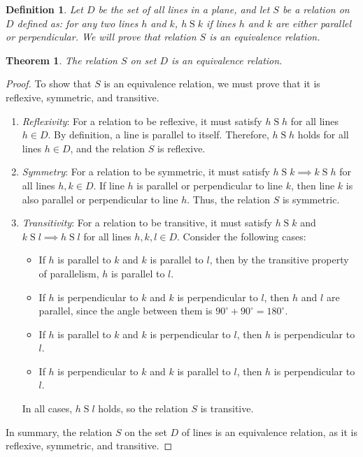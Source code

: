 \documentclass{article}
\newtheorem{theorem}{Theorem}
\newtheorem{definition}{Definition}
\begin{document}
\newpage

\begin{definition}
    Let $D$ be the set of all lines in a plane, and let $S$ be a relation on $D$ defined as: for any two lines $h$ and $k$, $h \mathrel{S} k$ if lines $h$ and $k$ are either parallel or perpendicular. We will prove that relation $S$ is an equivalence relation.
    \end{definition}
    
    \begin{theorem}
    The relation $S$ on set $D$ is an equivalence relation.
    \end{theorem}
    
    \begin{proof}
    To show that $S$ is an equivalence relation, we must prove that it is reflexive, symmetric, and transitive.
    
    \begin{enumerate}
    \item \textit{Reflexivity}: For a relation to be reflexive, it must satisfy $h \mathrel{S} h$ for all lines $h \in D$. By definition, a line is parallel to itself. Therefore, $h \mathrel{S} h$ holds for all lines $h \in D$, and the relation $S$ is reflexive.
    
    \item \textit{Symmetry}: For a relation to be symmetric, it must satisfy $h \mathrel{S} k \implies k \mathrel{S} h$ for all lines $h, k \in D$. If line $h$ is parallel or perpendicular to line $k$, then line $k$ is also parallel or perpendicular to line $h$. Thus, the relation $S$ is symmetric.
    
    \item \textit{Transitivity}: For a relation to be transitive, it must satisfy $h \mathrel{S} k$ and $k \mathrel{S} l \implies h \mathrel{S} l$ for all lines $h, k, l \in D$. Consider the following cases:
    
        \begin{itemize}
        \item If $h$ is parallel to $k$ and $k$ is parallel to $l$, then by the transitive property of parallelism, $h$ is parallel to $l$.
        \item If $h$ is perpendicular to $k$ and $k$ is perpendicular to $l$, then $h$ and $l$ are parallel, since the angle between them is $90^\circ + 90^\circ = 180^\circ$.
        \item If $h$ is parallel to $k$ and $k$ is perpendicular to $l$, then $h$ is perpendicular to $l$.
        \item If $h$ is perpendicular to $k$ and $k$ is parallel to $l$, then $h$ is perpendicular to $l$.
        \end{itemize}
    
    In all cases, $h \mathrel{S} l$ holds, so the relation $S$ is transitive.
    \end{enumerate}
    
    In summary, the relation $S$ on the set $D$ of lines is an equivalence relation, as it is reflexive, symmetric, and transitive.
    \end{proof}
    
\end{document}
